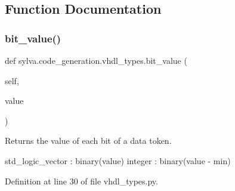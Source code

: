 \subsection{Function Documentation}
\mbox{\label{namespacesylva_1_1code__generation_1_1vhdl__types_a44144317f9950d183cd2fff09c4e60c3}} 
\subsubsection{\texorpdfstring{bit\+\_\+value()}{bit\_value()}}
{\footnotesize\ttfamily def sylva.\+code\+\_\+generation.\+vhdl\+\_\+types.\+bit\+\_\+value (\begin{DoxyParamCaption}\item[{}]{self,  }\item[{}]{value }\end{DoxyParamCaption})}

\begin{DoxyVerb}Returns the value of each bit of a data token.

std_logic_vector : binary(value)
integer          : binary(value - min)
\end{DoxyVerb}
 

Definition at line 30 of file vhdl\+\_\+types.\+py.


